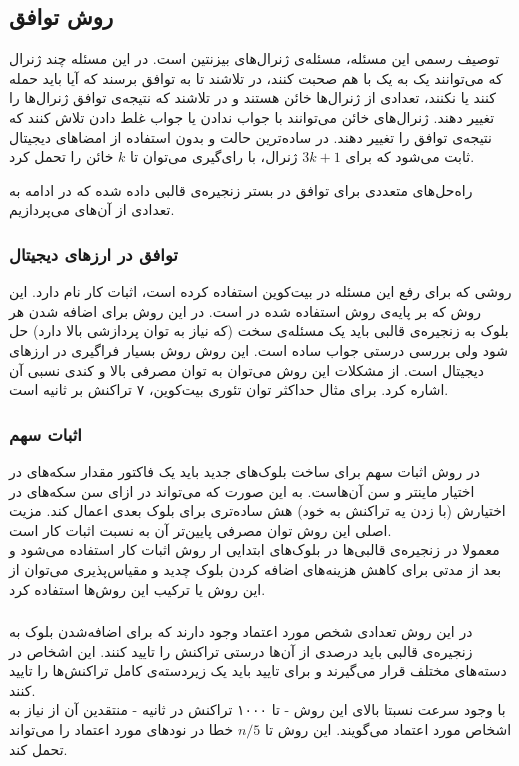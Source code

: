 \subsection{روش توافق}
توصیف رسمی این مسئله، مسئله‌ی ژنرال‌های بیزنتین 
\cite{byzantine}
است. در این مسئله چند ژنرال که می‌توانند یک به یک با هم صحبت کنند، در تلاشند تا به توافق برسند که آیا باید حمله کنند یا نکنند، تعدادی از ژنرال‌ها خائن هستند و در تلاشند که نتیجه‌ی توافق ژنرال‌ها را تغییر دهند. ژنرال‌های خائن می‌توانند با جواب ندادن یا جواب غلط دادن تلاش کنند که نتیجه‌ی توافق را تغییر دهند. در ساده‌ترین حالت و بدون استفاده از امضا‌های دیجیتال ثابت می‌شود که برای $ 3k + 1 $ ژنرال، با رای‌گیری می‌توان تا $ k $ خائن را تحمل کرد. 
\par
راه‌حل‌های متعددی برای توافق 
در بستر زنجیره‌ی قالبی داده شده که در ادامه به تعدادی از آن‌های می‌پردازیم.
\subsubsection{توافق در ارزهای دیجیتال}
روشی که 
\cite{bitcoin}
برای رفع این مسئله در بیت‌کوین استفاده کرده است، اثبات کار 
نام دارد. این روش که بر پایه‌ی روش استفاده شده در 
\cite{hashcash}
است. در این روش برای اضافه شدن هر بلوک به زنجیره‌ی قالبی باید یک مسئله‌ی سخت (که نیاز به توان پردازشی بالا دارد) حل شود ولی بررسی درستی جواب ساده است. این روش روش بسیار فراگیری در ارز‌های دیجیتال است. از مشکلات این روش می‌توان به توان مصرفی بالا و کندی نسبی آن اشاره کرد. برای مثال حداکثر توان تئوری بیت‌کوین، ۷ تراکنش بر ثانیه است. 
\subsubsection{اثبات سهم}
در روش اثبات سهم
\cite{PoS}
برای ساخت بلوک‌های جدید باید یک فاکتور مقدار سکه‌های در اختیار ماینتر و سن آن‌هاست. به این صورت که می‌تواند در ازای سن‌ سکه‌های در اختیارش (با زدن یه تراکنش به خود) هش ساده‌تری برای بلوک بعدی اعمال کند. مزیت اصلی این روش توان مصرفی پایین‌تر آن به نسبت اثبات کار است. 
\\
معمولا در زنجیره‌ی قالبی‌ها در بلوک‌های ابتدایی ار روش اثبات کار استفاده می‌شود و بعد از مدتی برای کاهش هزینه‌های اضافه کردن بلوک چدید و مقیاس‌پذیری می‌توان از این روش یا ترکیب این روش‌ها استفاده کرد.

\subsubsection{}
در این روش
\cite{ripple} \cite{ripple2}
 تعدادی شخص مورد اعتماد وجود دارند که برای اضافه‌شدن بلوک به زنجیره‌ی قالبی باید درصدی از آن‌ها درستی تراکنش را تایید کنند. این اشخاص در دسته‌های مختلف قرار می‌گیرند و برای تایید باید یک زیردسته‌ی کامل تراکنش‌ها را تایید کنند.
 \\
 با وجود سرعت نسبتا بالای این روش - تا ۱۰۰۰ تراکنش در ثانیه - منتقدین آن از نیاز به اشخاص مورد اعتماد می‌گویند. این روش تا $ n /5 $ خطا در نود‌های مورد اعتماد را می‌تواند تحمل کند.


